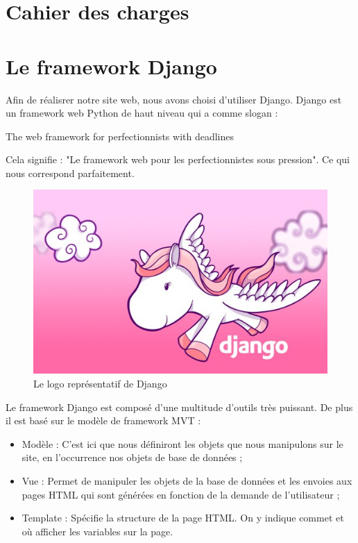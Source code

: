 \documentclass[twoside,UTF8]{EPURapport}
\begin{document}
\chapter{Cahier des charges}

\chapter{Le framework Django}
Afin de réalisrer notre site web, nous avons choisi d'utiliser Django. Django est un framework web Python de haut niveau qui a comme slogan :\\
\begin{center}
    \begin{LARGE}
    The web framework for perfectionnists with deadlines
    \end{LARGE}
\end{center}

Cela signifie : "Le framework web pour les perfectionnistes sous pression". Ce qui nous correspond parfaitement.

\begin{figure}[H]
 \centering
 \includegraphics[width=0.5\linewidth]{./logos/pony.jpg}
 \caption{Le logo représentatif de Django}
\end{figure}

Le framework Django est composé d'une multitude d'outils très puissant. De plus il est basé sur le modèle de framework MVT :
\begin{itemize}
    \item Modèle : C'est ici que nous définiront les objets que nous manipulons sur le site, en l'occurrence nos objets de base de données ;
    \item Vue : Permet de manipuler les objets de la base de données et les envoies aux pages HTML qui sont générées en fonction de la demande de l'utilisateur ;
    \item Template : Spécifie la structure de la page HTML. On y indique commet et où afficher les variables sur la page.
\end{itemize}
\end{document}
